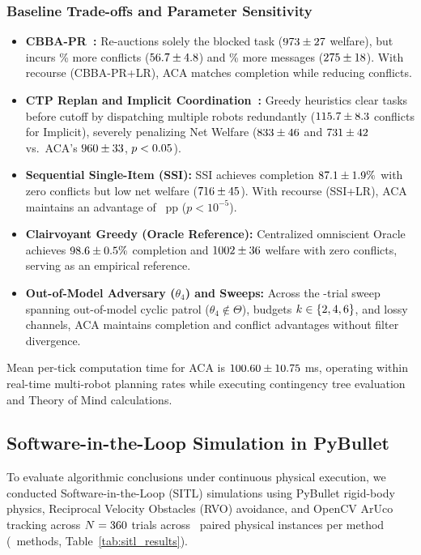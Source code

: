 \documentclass[lettersize,journal]{IEEEtran}
\begin{document}
\subsubsection{Baseline Trade-offs and Parameter Sensitivity}
\begin{itemize}[leftmargin=*,itemsep=0pt,topsep=1pt,parsep=0pt]
    \item \textbf{CBBA-PR~\cite{buckman2019partial}:} Re-auctions solely the blocked task ($973 \pm 27$ welfare), but incurs \aeCbbaPartialConfIncreasePct\% more conflicts ($56.7 \pm 4.8$) and \aeCbbaPartialMsgIncreasePct\% more messages ($275 \pm 18$). With recourse (CBBA-PR+LR), ACA matches completion while reducing conflicts.
    \item \textbf{CTP Replan and Implicit Coordination~\cite{alighanbari2005implicit}:} Greedy heuristics clear tasks before cutoff by dispatching multiple robots redundantly ($115.7 \pm 8.3$ conflicts for Implicit), severely penalizing Net Welfare ($833 \pm 46$ and $731 \pm 42$ vs.\ ACA's $960 \pm 33$, $p < 0.05$).
    \item \textbf{Sequential Single-Item (SSI):} SSI achieves completion $87.1 \pm 1.9\%$ with zero conflicts but low net welfare ($716 \pm 45$). With recourse (SSI+LR), ACA maintains an advantage of \aeHtwoSsiLrDiff~pp ($p < 10^{-5}$).
    \item \textbf{Clairvoyant Greedy (Oracle Reference):} Centralized omniscient Oracle achieves $98.6 \pm 0.5\%$ completion and $1002 \pm 36$ welfare with zero conflicts, serving as an empirical reference.
    \item \textbf{Out-of-Model Adversary ($\theta_4$) and Sweeps:} Across the \aeTotalTrials-trial sweep spanning out-of-model cyclic patrol ($\theta_4 \notin \Theta$), budgets $k \in \{2, 4, 6\}$, and lossy channels, ACA maintains completion and conflict advantages without filter divergence.
\end{itemize}
Mean per-tick computation time for ACA is $100.60 \pm 10.75$ ms, operating within real-time multi-robot planning rates while executing contingency tree evaluation and Theory of Mind calculations.

\subsection{Software-in-the-Loop Simulation in PyBullet}
To evaluate algorithmic conclusions under continuous physical execution, we conducted Software-in-the-Loop (SITL) simulations using PyBullet rigid-body physics, Reciprocal Velocity Obstacles (RVO) avoidance, and OpenCV ArUco tracking across $N = 360$ trials across \aeSitlPhysicalInstances\ paired physical instances per method (\aeSitlMethodsCount\ methods, Table~\ref{tab:sitl_results}).
\end{document}
